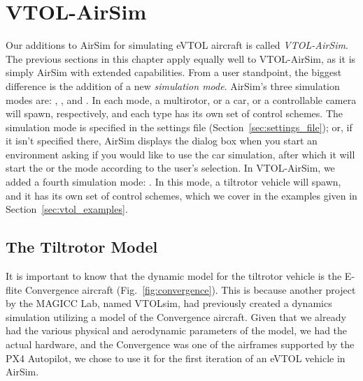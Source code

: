 \section{VTOL-AirSim}\label{sec:vtolairsim}
Our additions to AirSim for simulating eVTOL aircraft is called \textit{VTOL-AirSim}. The previous sections in this chapter apply equally well to VTOL-AirSim, as it is simply AirSim with extended capabilities. From a user standpoint, the biggest difference is the addition of a new \textit{simulation mode}. AirSim's three simulation modes are: , , and . In each mode, a multirotor, or a car, or a controllable camera will spawn, respectively, and each type has its own set of control schemes. The simulation mode is specified in the settings file (Section~\ref{sec:settings_file}); or, if it isn't specified there, AirSim displays the dialog box when you start an environment asking if you would like to use the car simulation, after which it will start the  or the  mode according to the user's selection. In VTOL-AirSim, we added a fourth simulation mode: . In this mode, a tiltrotor vehicle will spawn, and it has its own set of control schemes, which we cover in the examples given in Section~\ref{sec:vtol_examples}.

\subsection{The Tiltrotor Model}\label{sec:tiltrotor_model}
It is important to know that the dynamic model for the tiltrotor vehicle is the E-flite Convergence aircraft (Fig.~\ref{fig:convergence}). This is because another project by the MAGICC Lab, named VTOLsim, had previously created a dynamics simulation utilizing a model of the Convergence aircraft. Given that we already had the various physical and aerodynamic parameters of the model, we had the actual hardware, and the Convergence was one of the airframes supported by the PX4 Autopilot, we chose to use it for the first iteration of an eVTOL vehicle in AirSim.

